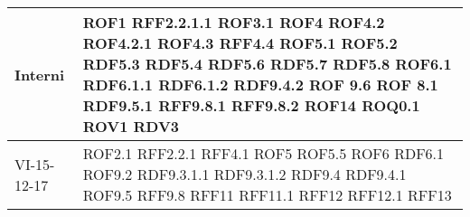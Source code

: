 \documentclass[../AnalisideiRequisiti.tex]{subfiles}
\begin{document}
\begin{longtable}{| p{4cm} | p{4cm} |}
		\newline Interni &  \newline ROF1 \newline RFF2.2.1.1 \newline ROF3.1 \newline ROF4 \newline ROF4.2  \newline ROF4.2.1  \newline ROF4.3  \newline RFF4.4 \newline ROF5.1 \newline ROF5.2 \newline RDF5.3 \newline RDF5.4 \newline RDF5.6  \newline RDF5.7  \newline RDF5.8 \newline ROF6.1 \newline RDF6.1.1 \newline RDF6.1.2 \newline RDF9.4.2 \newline ROF 9.6  \newline ROF 8.1  \newline RDF9.5.1  \newline RFF9.8.1  \newline RFF9.8.2 \newline ROF14 \newline ROQ0.1  \newline ROV1  \newline RDV3 \\[1em]
	\hline
		\newline VI-15-12-17 & \newline ROF2.1 \newline RFF2.2.1 \newline RFF4.1 \newline ROF5 \newline ROF5.5 \newline ROF6 \newline RDF6.1 \newline ROF9.2 \newline RDF9.3.1.1 \newline RDF9.3.1.2 \newline RDF9.4 \newline RDF9.4.1 \newline ROF9.5 \newline RFF9.8 \newline RFF11 \newline RFF11.1 \newline RFF12 \newline RFF12.1 \newline RFF13 \\[1em]

\end{longtable}
\end{document}
